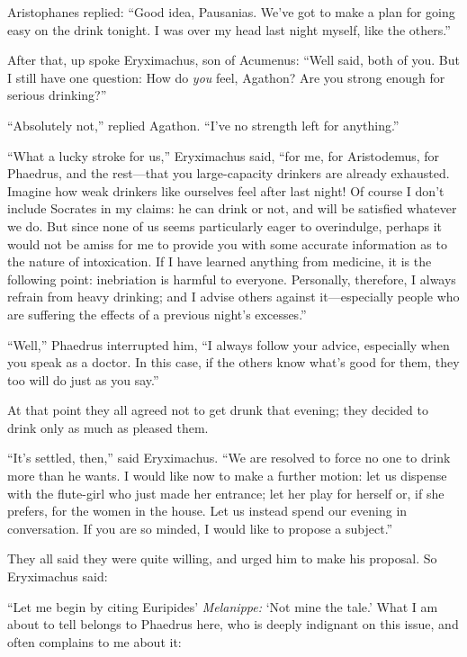 Aristophanes replied: “Good idea, Pausanias. We've got to make a plan
for going easy on the drink tonight. I was over my head last night
myself, like the others.”

After that, up spoke Eryximachus, son of Acumenus: “Well said, both of
you. But I still have one question: How do {\em you} feel, Agathon? Are
you strong enough for serious drinking?”

“Absolutely not,” replied Agathon. “I've no strength left for anything.”

“What a lucky stroke for us,” Eryximachus said, “for me, for
Aristodemus, for Phaedrus, and the rest---that you large-capacity
drinkers are already exhausted. Imagine how weak drinkers like ourselves
feel after last night! Of course I don't include Socrates in my claims:
he can drink or not, and will be satisfied whatever we do. But since
none of us seems particularly eager to overindulge, perhaps it would not
be amiss for me to provide you with some accurate information as
to the nature of intoxication. If I have learned anything from medicine,
it is the following point: inebriation is harmful to everyone.
Personally, therefore, I always refrain from heavy drinking; and I
advise others against it---especially people who are suffering the
effects of a previous night's excesses.”

“Well,” Phaedrus interrupted him, “I always follow your advice,
especially when you speak as a doctor. In this case, if the others know
what's good for them, they too will do just as you say.”

At that point they all agreed not to get drunk that evening;
they decided to drink only as much as pleased them.

“It's settled, then,” said Eryximachus. “We are resolved to force no one
to drink more than he wants. I would like now to make a further motion:
let us dispense with the flute-girl who just made her entrance; let her
play for herself or, if she prefers, for the women in the house. Let us
instead spend our evening in conversation. If you are so minded, I would
like to propose a subject.”

They all said they were quite willing, and urged him to make his
proposal. So Eryximachus said:

“Let me begin by citing Euripides' {\em Melanippe:} ‘Not mine the tale.'
What I am about to tell belongs to Phaedrus here, who is deeply
indignant on this issue, and often complains to me about it:

